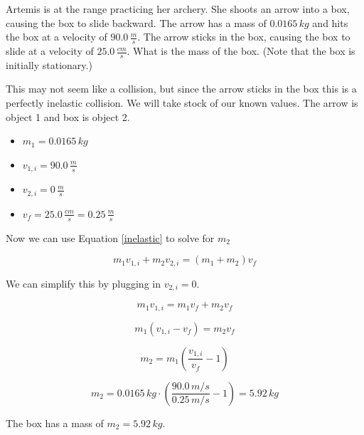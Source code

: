 \documentclass[12pt]{book}
\begin{document}
\begin{exampleblock}

Artemis is at the range practicing her archery. She shoots an arrow into a box, causing the box to slide backward. The arrow has a mass of $0.0165 \, kg$ and hits the box at a velocity of $90.0 \, \frac{m}{s}$. The arrow sticks in the box, causing the box to slide at a velocity of $25.0 \, \frac{cm}{s}$. What is the mass of the box. (Note that the box is initially stationary.)

\hspace{10pt}

This may not seem like a collision, but since the arrow sticks in the box this is a perfectly inelastic collision. We will take stock of our known values. The arrow is object 1 and box is object 2.

\begin{itemize}
\item $m_1 = 0.0165 \, kg$
\item $v_{1,i} = 90.0 \, \frac{m}{s}$
\item $v_{2,i} = 0 \, \frac{m}{s}$
\item $v_{f} = 25.0 \, \frac{cm}{s} = 0.25 \, \frac{m}{s}$
\end{itemize}

Now we can use Equation \ref{inelastic} to solve for $m_2$

\begin{equation}
m_1 v_{1,i} + m_2 v_{2,i} = (m_1 + m_2) v_f
\end{equation}

We can simplify this by plugging in $v_{2,i} = 0$.

\begin{equation}
m_1 v_{1,i} = m_1 v_f + m_2 v_f
\end{equation}

\begin{equation}
m_1 (v_{1,i} - v_f) = m_2 v_f
\end{equation}

\begin{equation}
m_2 = m_1 \left( \frac{v_{1,i}}{v_f} - 1 \right)
\end{equation}

\begin{equation}
m_2 = 0.0165 \, kg \cdot \left( \frac{90.0 \, m/s}{0.25 \, m/s} - 1 \right) = 5.92 \, kg
\end{equation}

The box has a mass of $m_2 = 5.92 \, kg$.

\end{exampleblock}
\end{document}
